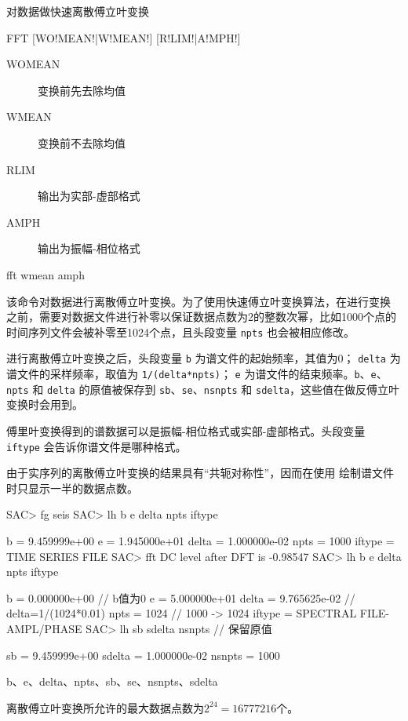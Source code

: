 \label{cmd:fft}

对数据做快速离散傅立叶变换

\begin{SACSTX}
FFT [WO!MEAN!|W!MEAN!] [R!LIM!|A!MPH!]
\end{SACSTX}

\begin{description}
\item [WOMEAN] 变换前先去除均值
\item [WMEAN] 变换前不去除均值
\item [RLIM] 输出为实部-虚部格式
\item [AMPH] 输出为振幅-相位格式
\end{description}

\begin{SACDFT}
fft wmean amph
\end{SACDFT}

该命令对数据进行离散傅立叶变换。为了使用快速傅立叶变换算法，在进行变换
之前，需要对数据文件进行补零以保证数据点数为2的整数次幂，比如1000个点的
时间序列文件会被补零至1024个点，且头段变量 \texttt{npts} 也会被相应修改。

进行离散傅立叶变换之后，头段变量 \texttt{b} 为谱文件的起始频率，其值为0；
\texttt{delta} 为谱文件的采样频率，取值为 \texttt{1/(delta*npts)}；
\texttt{e} 为谱文件的结束频率。\texttt{b}、\texttt{e}、\texttt{npts} 和
\texttt{delta} 的原值被保存到 \texttt{sb}、\texttt{se}、\texttt{nsnpts}
和 \texttt{sdelta}，这些值在做反傅立叶变换时会用到。

傅里叶变换得到的谱数据可以是振幅-相位格式或实部-虚部格式。头段变量
\texttt{iftype} 会告诉你谱文件是哪种格式。

由于实序列的离散傅立叶变换的结果具有``共轭对称性''，因而在使用
 绘制谱文件时只显示一半的数据点数。

\begin{SACCode}
SAC> fg seis
SAC> lh b e delta npts iftype

          b = 9.459999e+00
          e = 1.945000e+01
      delta = 1.000000e-02
       npts = 1000
     iftype = TIME SERIES FILE
SAC> fft
 DC level after DFT is -0.98547
SAC> lh b e delta npts iftype

          b = 0.000000e+00              // b值为0
          e = 5.000000e+01
      delta = 9.765625e-02              // delta=1/(1024*0.01)
       npts = 1024                      // 1000 -> 1024
     iftype = SPECTRAL FILE-AMPL/PHASE
SAC> lh sb sdelta nsnpts                // 保留原值

         sb = 9.459999e+00
     sdelta = 1.000000e-02
     nsnpts = 1000
\end{SACCode}

b、e、delta、npts、sb、se、nsnpts、sdelta

离散傅立叶变换所允许的最大数据点数为$2^{24}=16777216$个。
